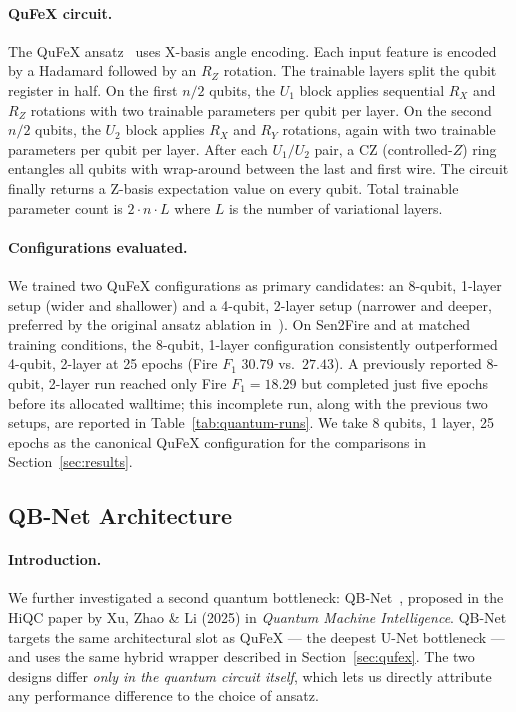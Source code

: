 \documentclass{article}
\begin{document}
\paragraph{QuFeX circuit.} The QuFeX ansatz~\cite{qufex} uses X-basis angle encoding. Each input feature is encoded by a Hadamard followed by an $R_Z$ rotation. The trainable layers split the qubit register in half. On the first $n/2$ qubits, the $U_1$ block applies sequential $R_X$ and $R_Z$ rotations with two trainable parameters per qubit per layer. On the second $n/2$ qubits, the $U_2$ block applies $R_X$ and $R_Y$ rotations, again with two trainable parameters per qubit per layer. After each $U_1/U_2$ pair, a CZ (controlled-$Z$) ring entangles all qubits with wrap-around between the last and first wire. The circuit finally returns a Z-basis expectation value on every qubit. Total trainable parameter count is $2 \cdot n \cdot L$ where $L$ is the number of variational layers.

\paragraph{Configurations evaluated.} We trained two QuFeX configurations as primary candidates: an 8-qubit, 1-layer setup (wider and shallower) and a 4-qubit, 2-layer setup (narrower and deeper, preferred by the original ansatz ablation in~\cite{qufex}). On Sen2Fire and at matched training conditions, the 8-qubit, 1-layer configuration consistently outperformed 4-qubit, 2-layer at 25 epochs (Fire $F_1$ $30.79$ vs.\ $27.43$). A previously reported 8-qubit, 2-layer run reached only Fire $F_1 = 18.29$ but completed just five epochs before its allocated walltime; this incomplete run, along with the previous two setups, are reported in Table~\ref{tab:quantum-runs}. We take 8 qubits, 1 layer, 25 epochs as the canonical QuFeX configuration for the comparisons in Section~\ref{sec:results}.

\subsection{QB-Net Architecture}
\label{sec:qbnet}

\paragraph{Introduction.} We further investigated a second quantum bottleneck: QB-Net~\cite{qbnet}, proposed in the HiQC paper by Xu, Zhao \& Li (2025) in \textit{Quantum Machine Intelligence}. QB-Net targets the same architectural slot as QuFeX --- the deepest U-Net bottleneck --- and uses the same hybrid wrapper described in Section~\ref{sec:qufex}. The two designs differ \emph{only in the quantum circuit itself}, which lets us directly attribute any performance difference to the choice of ansatz.
\end{document}
